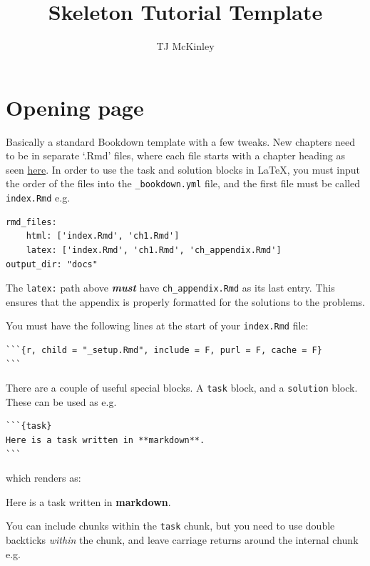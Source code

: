 \documentclass[]{book}
\title{Skeleton Tutorial Template}
\author{TJ McKinley}
\date{}
\newcommand{\bblockT}[2][Task]{\begin{tcolorbox}[title = #1 #2, parbox = false]}
\newcommand{\eblockT}{\end{tcolorbox}}
\begin{document}
\maketitle

{
\hypersetup{linkcolor=}
\setcounter{tocdepth}{1}
\tableofcontents
}
\hypertarget{opening-page}{%
\chapter{Opening page}\label{opening-page}}

Basically a standard Bookdown template with a few tweaks. New chapters need to be in separate `.Rmd' files, where each file starts with a chapter heading as seen \href{https://bookdown.org/yihui/bookdown/usage.html}{here}. In order to use the task and solution blocks in \LaTeX, you must input the order of the files into the \texttt{\_bookdown.yml} file, and the first file must be called \texttt{index.Rmd} e.g.

\begin{verbatim}
rmd_files:
    html: ['index.Rmd', 'ch1.Rmd']
    latex: ['index.Rmd', 'ch1.Rmd', 'ch_appendix.Rmd']
output_dir: "docs"
\end{verbatim}

The \texttt{latex:} path above \textbf{\emph{must}} have \texttt{\textquotesingle{}ch\_appendix.Rmd\textquotesingle{}} as its last entry. This ensures that the appendix is properly formatted for the solutions to the problems.

You must have the following lines at the start of your \texttt{index.Rmd} file:

\begin{verbatim}
```{r, child = "_setup.Rmd", include = F, purl = F, cache = F}
```
\end{verbatim}

There are a couple of useful special blocks. A \texttt{task} block, and a \texttt{solution} block. These can be used as e.g.

\begin{verbatim}
```{task}
Here is a task written in **markdown**.
```
\end{verbatim}

which renders as:

\hypertarget{tsk1}{}\bblockT[Task]{\phantomsection\label{sol1}1}

Here is a task written in \textbf{markdown}.
\eblockT

You can include chunks within the \texttt{task} chunk, but you need to use double backticks \emph{within} the chunk, and leave carriage returns around the internal chunk e.g.
\end{document}
